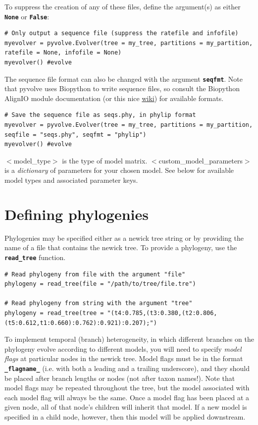 \documentclass{article}
\newcommand{\code}[1]{\textbf{\texttt{\small{#1}}}}
\begin{document}
To suppress the creation of any of these files, define the argument(s) as either \code{None} or \code{False}:
\begin{lstlisting}
# Only output a sequence file (suppress the ratefile and infofile)
myevolver = pyvolve.Evolver(tree = my_tree, partitions = my_partition, ratefile = None, infofile = None)
myevolver() #evolve
\end{lstlisting}

The sequence file format can also be changed with the argument \code{seqfmt}. Note that pyvolve uses Biopython to write sequence files, so consult the Biopython AlignIO module documentation (or this nice \href{http://biopython.org/wiki/AlignIO}{wiki}) for available formats.
\begin{lstlisting}
# Save the sequence file as seqs.phy, in phylip format 
myevolver = pyvolve.Evolver(tree = my_tree, partitions = my_partition, seqfile = "seqs.phy", seqfmt = "phylip")
myevolver() #evolve
\end{lstlisting}


$<$model\_type$>$ is the type of model matrix. $<$custom\_model\_parameters$>$ is a \textit{dictionary} of parameters for your chosen model. See below for available model types and associated parameter keys.



\section{Defining phylogenies}\label{sec:phylogeny}

Phylogenies may be specified either as a newick tree string or by providing the name of a file that contains the newick tree. To provide a phylogeny, use the \code{read\_tree} function.
\begin{lstlisting}
# Read phylogeny from file with the argument "file"
phylogeny = read_tree(file = "/path/to/tree/file.tre")

# Read phylogeny from string with the argument "tree"
phylogeny = read_tree(tree = "(t4:0.785,(t3:0.380,(t2:0.806,(t5:0.612,t1:0.660):0.762):0.921):0.207);")
\end{lstlisting}



To implement temporal (branch) heterogeneity, in which different branches on the phylogeny evolve according to different models, you will need to specify \emph{model flags} at particular nodes in the newick tree. Model flags must be in the format \code{\_flagname\_} (i.e. with both a leading and a trailing underscore), and they should be placed after branch lengths or nodes (not after taxon names!). Note that model flags may be repeated throughout the tree, but the model associated with each model flag will always be the same. Once a model flag has been placed at a given node, all of that node's children will inherit that model. If a new model is specified in a child node, however, then this model will be applied downstream.
\end{document}
